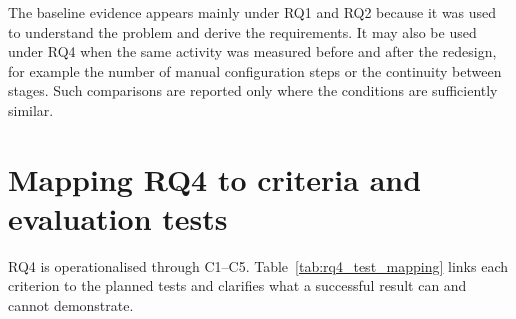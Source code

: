 The baseline evidence appears mainly under RQ1 and RQ2 because it was used to understand the problem and derive the requirements. It may also be used under RQ4 when the same activity was measured before and after the redesign, for example the number of manual configuration steps or the continuity between stages. Such comparisons are reported only where the conditions are sufficiently similar.

\section{Mapping RQ4 to criteria and evaluation tests}
RQ4 is operationalised through C1--C5. Table~\ref{tab:rq4_test_mapping} links each criterion to the planned tests and clarifies what a successful result can and cannot demonstrate.

